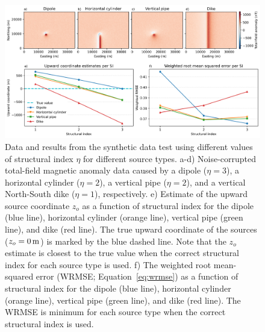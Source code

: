 \begin{figure}[tb!]
\centering
\includegraphics[width=1\linewidth]{figures/synthetic-structural-index.png}
\caption{
    Data and results from the synthetic data test using different values of structural index $\eta$ for different source types.
    a-d) Noise-corrupted total-field magnetic anomaly data caused by a dipole ($\eta=3$), a horizontal cylinder ($\eta=2$), a vertical pipe ($\eta=2$), and a vertical North-South dike ($\eta=1$), respectively.
    e) Estimate of the upward source coordinate $z_o$ as a function of structural index for the dipole (blue line), horizontal cylinder (orange line), vertical pipe (green line), and dike (red line). 
    The true upward coordinate of the sources ($z_o = \SynSITrueUp$) is marked by the blue dashed line. Note that the $z_o$ estimate is closest to the true value when the correct structural index for each source type is used.
    f) The weighted root mean-squared error (WRMSE; Equation~\ref{eq:wrmse}) as a function of structural index for the dipole (blue line), horizontal cylinder (orange line), vertical pipe (green line), and dike (red line). The WRMSE is minimum for each source type when the correct structural index is used.
}
\label{fig:si}
\end{figure}

